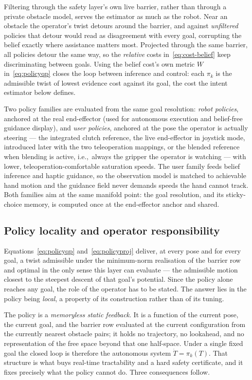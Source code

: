 Filtering through the safety layer's own live barrier, rather than through a private obstacle model, serves the estimator as much as the robot. Near an obstacle the operator's twist detours around the barrier, and against \emph{unfiltered} policies that detour would read as disagreement with every goal, corrupting the belief exactly where assistance matters most. Projected through the same barrier, all policies detour the same way, so the \emph{relative} costs in~\eqref{eq:cost-belief} keep discriminating between goals. Using the belief cost's own metric $W$ in~\eqref{eq:policyqp} closes the loop between inference and control: each $\pi_k$ is the admissible twist of lowest evidence cost against its goal, the cost the intent estimator below defines.

Two policy families are evaluated from the same goal resolution: \emph{robot policies}, anchored at the real end-effector (used for autonomous execution and belief-free guidance display), and \emph{user policies}, anchored at the pose the operator is actually steering --- the integrated clutch reference, the live end-effector in joystick mode, introduced later with the two teleoperation mappings, or the blended reference when blending is active, i.e.,\ always the gripper the operator is watching --- with lower, teleoperation-comfortable saturation speeds. The user family feeds belief inference and haptic guidance, so the observation model is matched to achievable hand motion and the guidance field never demands speeds the hand cannot track. Both families aim at the same manifold point: the goal resolution, and its sticky-choice memory, is computed once at the end-effector anchor and shared.

\subsection{Policy locality and operator responsibility}
\label{sec:locality}

Equations~\eqref{eq:policyqp} and~\eqref{eq:policyproj} deliver, at every pose and for every goal, a twist admissible under the minimum-norm realisation of the barrier row and optimal in the only sense this layer can evaluate --- the admissible motion closest to the steepest descent of that goal's potential. Since the policy alone reaches any goal, the role of the operator has to be stated. The answer lies in the policy being \emph{local}, a property of its construction rather than of its tuning.

The policy is a \emph{memoryless static feedback}. It is a function of the current pose, the current goal, and the barrier row evaluated at the current configuration from the currently nearest obstacle pairs; it holds no trajectory, no lookahead, and no representation of the free space beyond that one half-space. Under a single fixed goal the closed loop is therefore the autonomous system $\dot{T} = \pi_k(T)$. That structure is what buys real-time tractability and a hard safety certificate, and it fixes precisely what the policy cannot do. Three consequences follow.

